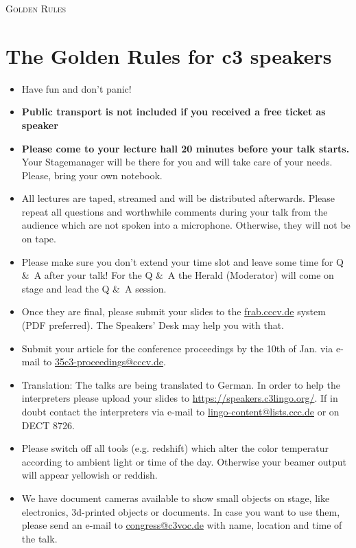 \documentclass[paper=a4]{scrartcl}
\begin{document}
	\begin{center} \textsc{\Huge Golden Rules}\end{center}
	\hfill
	\section*{The Golden Rules for c3 speakers}
	\begin{itemize}
		\item Have fun and don't panic!
		\item \textbf{Public transport is not included if you received a free ticket as speaker}
		\item \textbf{Please come to your lecture hall 20 minutes before your talk starts.} Your
		Stagemanager will be there	for	you and will take care of your needs. Please, bring your own notebook.
		\item All lectures are taped, streamed and will be distributed afterwards. Please repeat all questions and worthwhile comments during your talk from the audience which are not spoken into a microphone. Otherwise, they will not be on tape.
		\item Please make sure you don't extend your time slot and
		leave some time for Q \&\ A after your talk! For the Q \&\ A  the Herald (Moderator) will come on stage and lead the Q \&\ A session. 
		\item Once they are final, please submit your slides to the \url{frab.cccv.de} system (PDF preferred). The Speakers' Desk may help you with that.
		\item Submit your article for the conference proceedings by the 10th of Jan. via e-mail to \url{35c3-proceedings@cccv.de}.
		\item Translation: The talks are being translated to German. In order to help the interpreters please upload your slides to \url{https://speakers.c3lingo.org/}. If in doubt contact the interpreters via e-mail  to \url{lingo-content@lists.ccc.de} or on DECT 8726.
		\item Please switch off all tools (e.g. redshift) which alter the color temperatur according to ambient light or time of the day. Otherwise your beamer output will appear yellowish or reddish.
		\item We have document cameras available to show small objects on stage, like electronics, 3d-printed objects or documents. In case you want to use them, please send an e-mail to \url{congress@c3voc.de} with name, location and time of the talk.
	\end{itemize}
\end{document}
